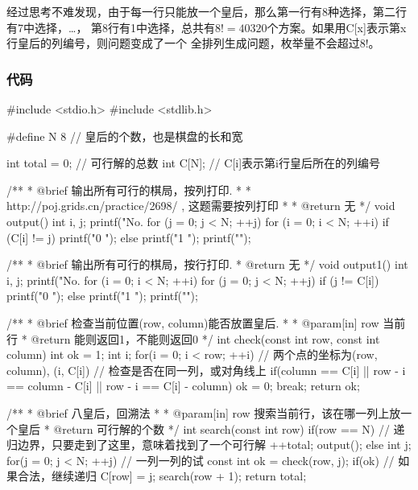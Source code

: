 经过思考不难发现，由于每一行只能放一个皇后，那么第一行有8种选择，第二行有7中选择，…，
第8行有1中选择，总共有$8!=40320$个方案。如果用C[x]表示第x行皇后的列编号，则问题变成了一个
全排列生成问题，枚举量不会超过8!。

\subsubsection{代码}
\begin{Codex}[label=eight_queen.c]
#include <stdio.h>
#include <stdlib.h>

#define N 8 // 皇后的个数，也是棋盘的长和宽

int total = 0;  // 可行解的总数
int C[N];  // C[i]表示第i行皇后所在的列编号

/**
 * @brief 输出所有可行的棋局，按列打印.
 *
 * http://poj.grids.cn/practice/2698/ , 这题需要按列打印
 *
 * @return 无
 */
void output() {
    int i, j;
    printf("No. %
    for (j = 0; j < N; ++j) {
        for (i = 0; i < N; ++i) {
            if (C[i] != j) {
                printf("0 ");
            } else {
                printf("1 ");
            }
        }
        printf("\n");
    }
}

/**
 * @brief 输出所有可行的棋局，按行打印.
 * @return 无
 */
void output1() {
    int i, j;
    printf("No. %
    for (i = 0; i < N; ++i) {
        for (j = 0; j < N; ++j) {
            if (j != C[i]) {
                printf("0 ");
            } else {
                printf("1 ");
            }
        }
        printf("\n");
    }
}

/**
 * @brief 检查当前位置(row, column)能否放置皇后.
 *
 * @param[in] row 当前行
 * @return 能则返回1，不能则返回0
 */
int check(const int row, const int column) {
    int ok = 1;
    int i;
    for(i = 0; i < row; ++i) {
        // 两个点的坐标为(row, column), (i, C[i])
        // 检查是否在同一列，或对角线上
        if(column == C[i] || row - i == column - C[i] ||
            row - i == C[i] - column) {
            ok = 0;
            break;
        }
    }
    return ok;
}

/**
 * @brief 八皇后，回溯法
 *
 * @param[in] row 搜索当前行，该在哪一列上放一个皇后
 * @return 可行解的个数
 */
int search(const int row) {
    if(row == N) {  // 递归边界，只要走到了这里，意味着找到了一个可行解
        ++total;
        output();
    } else {
        int j;
        for(j = 0; j < N; ++j) {  // 一列一列的试
            const int ok = check(row, j);
            if(ok) {  // 如果合法，继续递归
                C[row] = j;
                search(row + 1);
            }
        }
    }
    return total;
}


\end{Codex}
